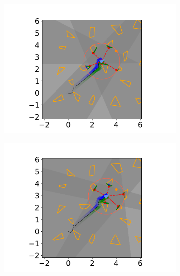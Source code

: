 \begin{figure}[h]
\begin{subfigure}{0.20\textwidth}
        \includegraphics[width=\textwidth]{../figures/Simulations/sim2unkenv/frame_7.pdf}
    \end{subfigure}%
    \hfill
    \begin{subfigure}{0.20\textwidth}
        \centering
        \includegraphics[width=\textwidth]{../figures/Simulations/sim2unkenv/frame_8.pdf}
    \end{subfigure}%
    \hfill
    \begin{subfigure}{0.20\textwidth}
        \centering

\end{subfigure}
\end{figure}
